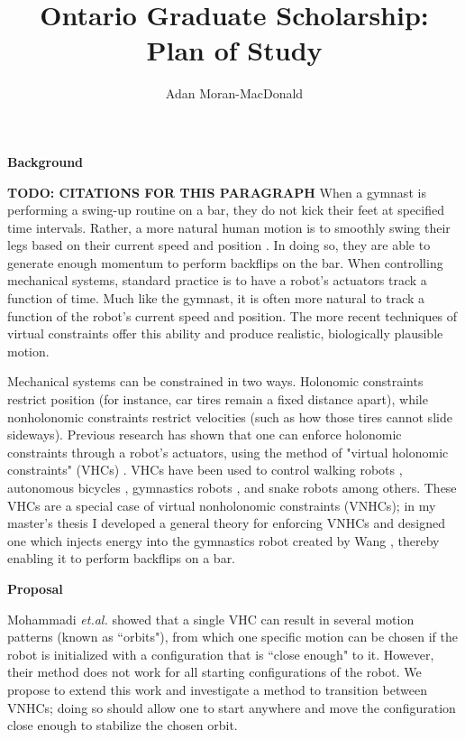 \documentclass[a4paper,12pt]{article}
\begin{document}
\title{Ontario Graduate Scholarship: Plan of Study}
\author{Adan Moran-MacDonald}
\date{}
\maketitle

\begin{large}
\textbf{Background}
\end{large}

\textbf{TODO: CITATIONS FOR THIS PARAGRAPH}
When a gymnast is performing a swing-up routine on a bar, they do not kick their
feet at specified time intervals. Rather, a more natural human motion is to
smoothly swing their legs based on their current speed and position
\cite{pendulum_length_giant_gymnastics}. In doing so, they are able to generate
enough momentum to perform backflips on the bar. When controlling mechanical
systems, standard practice is to have a robot's actuators track a function of
time. Much like the gymnast, it is often more natural to track a
function of the robot's current speed and position. The more recent techniques
of virtual constraints offer this ability and produce realistic, biologically
plausible motion.

Mechanical systems can be constrained in two ways. Holonomic constraints
restrict position (for instance, car tires remain a fixed distance apart), while
nonholonomic constraints restrict velocities (such as how those tires cannot
slide sideways). Previous research has shown that one can enforce holonomic
constraints through a robot's actuators, using the method of "virtual holonomic
constraints" (VHCs) \cite{vhcs_for_el_systems}. VHCs have been used to control
walking robots \cite{stable-walking}, autonomous bicycles \cite{bicycle},
gymnastics robots \cite{xingbo-thesis}, and snake robots \cite{snake-robot}
among others. These VHCs are a special case of virtual nonholonomic constraints
(VNHCs); in my master's thesis \cite{my-thesis} I developed a general theory for
enforcing VNHCs and designed one which injects energy into the gymnastics robot
created by Wang \cite{xingbo-thesis}, thereby enabling it to perform backflips
on a bar.

\begin{large} \textbf{Proposal} \end{large}

Mohammadi \textit{et.al.} \cite{manfredi-orbit-stabilization} showed that a
single VHC can result in several motion patterns (known as ``orbits"), from
which one specific motion can be chosen if the robot is initialized with a
configuration that is ``close enough" to it. However, their method does not
work for all starting configurations of the robot. We propose to extend this
work and investigate a method to transition between VNHCs; doing so should allow
one to start anywhere and move the configuration close enough to stabilize the
chosen orbit.
\end{document}
